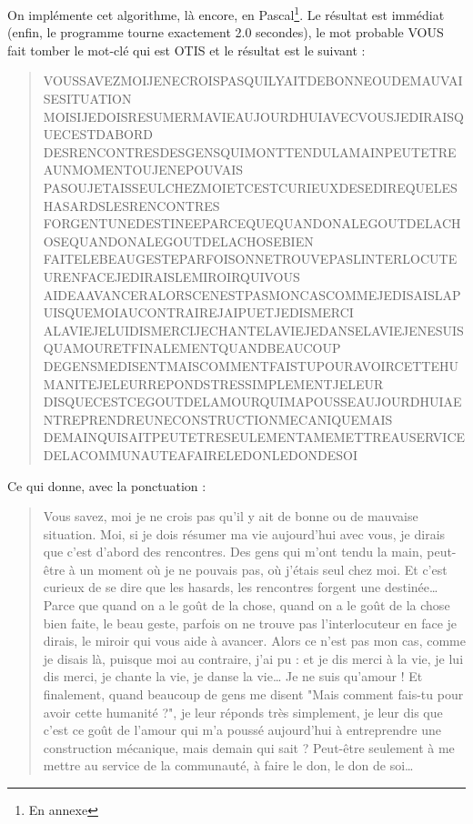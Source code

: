 \documentclass[a4paper, titlepage]{livret}
\begin{document}
On implémente cet algorithme, là encore, en Pascal\footnote{En annexe}.
Le résultat est immédiat (enfin, le programme tourne exactement 2.0 secondes), le mot probable \og VOUS \fg{} fait tomber le mot-clé qui est \og OTIS \fg{} et le résultat est le suivant :

\begin{center}
\begin{quote}
\og
VOUSSAVEZMOIJENECROISPASQUILYAITDEBONNEOUDEMAUVAISESITUATION
MOISIJEDOISRESUMERMAVIEAUJOURDHUIAVECVOUSJEDIRAISQUECESTDABORD
DESRENCONTRESDESGENSQUIMONTTENDULAMAINPEUTETREAUNMOMENTOUJENEPOUVAIS
PASOUJETAISSEULCHEZMOIETCESTCURIEUXDESEDIREQUELESHASARDSLESRENCONTRES
FORGENTUNEDESTINEEPARCEQUEQUANDONALEGOUTDELACHOSEQUANDONALEGOUTDELACHOSEBIEN
FAITELEBEAUGESTEPARFOISONNETROUVEPASLINTERLOCUTEURENFACEJEDIRAISLEMIROIRQUIVOUS
AIDEAAVANCERALORSCENESTPASMONCASCOMMEJEDISAISLAPUISQUEMOIAUCONTRAIREJAIPUETJEDISMERCI
ALAVIEJELUIDISMERCIJECHANTELAVIEJEDANSELAVIEJENESUISQUAMOURETFINALEMENTQUANDBEAUCOUP
DEGENSMEDISENTMAISCOMMENTFAISTUPOURAVOIRCETTEHUMANITEJELEURREPONDSTRESSIMPLEMENTJELEUR
DISQUECESTCEGOUTDELAMOURQUIMAPOUSSEAUJOURDHUIAENTREPRENDREUNECONSTRUCTIONMECANIQUEMAIS
DEMAINQUISAITPEUTETRESEULEMENTAMEMETTREAUSERVICEDELACOMMUNAUTEAFAIRELEDONLEDONDESOI
\fg{}
\end{quote}
\end{center}

Ce qui donne, avec la ponctuation :

\begin{center}
\begin{quote}
\og Vous savez, moi je ne crois pas qu'il y ait de bonne ou de mauvaise situation. Moi, si je dois résumer ma vie aujourd'hui avec vous, je dirais que c'est d'abord des rencontres. Des gens qui m'ont tendu la main, peut-être à un moment où je ne pouvais pas, où j'étais seul chez moi. Et c'est curieux de se dire que les hasards, les rencontres forgent une destinée… Parce que quand on a le goût de la chose, quand on a le goût de la chose bien faite, le beau geste, parfois on ne trouve pas l'interlocuteur en face je dirais, le miroir qui vous aide à avancer. Alors ce n'est pas mon cas, comme je disais là, puisque moi au contraire, j'ai pu : et je dis merci à la vie, je lui dis merci, je chante la vie, je danse la vie… Je ne suis qu'amour ! Et finalement, quand beaucoup de gens me disent "Mais comment fais-tu pour avoir cette humanité ?", je leur réponds très simplement, je leur dis que c'est ce goût de l'amour qui m'a poussé aujourd'hui à entreprendre une construction mécanique, mais demain qui sait ? Peut-être seulement à me mettre au service de la communauté, à faire le don, le don de soi… \fg{}
\end{quote}
\end{center}
\end{document}
